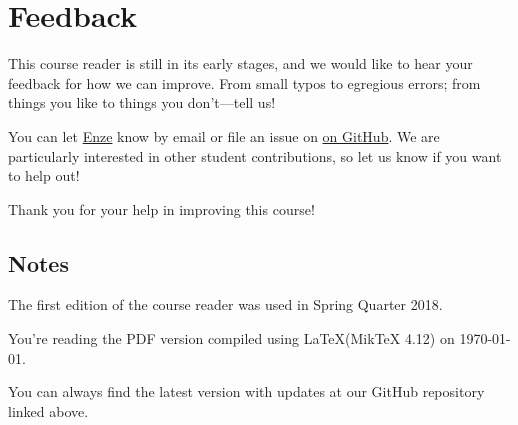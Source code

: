 %

%

\chapter{Feedback} \label{ch:feedback}

This course reader is still in its early stages, and we would like to hear your feedback for how we can improve. 
From small typos to egregious errors; from things you like to things you don't---tell us!

You can let \href{mailto:enze@stanford.edu}{Enze} know by email or file an issue on \href{https://github.com/Enze-Chen/mse_142_cr}{on GitHub}.
We are particularly interested in other student contributions, so let us know if you want to help out!

Thank you for your help in improving this course!

\section{Notes}

The first edition of the course reader was used in Spring Quarter 2018.

You're reading the PDF version compiled using \LaTeX (MikTeX 4.12) on \today.

You can always find the latest version with updates at our GitHub repository linked above.

%